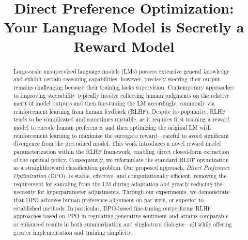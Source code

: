 \title{Direct Preference Optimization: Your Language Model is Secretly a Reward Model}

\begin{abstract}
Large-scale unsupervised language models (LMs) possess extensive general knowledge and exhibit certain reasoning capabilities; however, precisely steering their output remains challenging because their training lacks supervision. Contemporary approaches to improving steerability typically involve collecting human judgments on the relative merit of model outputs and then fine-tuning the LM accordingly, commonly via reinforcement learning from human feedback (RLHF). Despite its popularity, RLHF tends to be complicated and sometimes unstable, as it requires first training a reward model to encode human preferences and then optimizing the original LM with reinforcement learning to maximize the surrogate reward—careful to avoid significant divergence from the pretrained model. This work introduces a novel reward model parameterization within the RLHF framework, enabling direct closed-form extraction of the optimal policy. Consequently, we reformulate the standard RLHF optimization as a straightforward classification problem. Our proposed approach, \textit{Direct Preference Optimization} (DPO), is stable, effective, and computationally efficient, removing the requirement for sampling from the LM during adaptation and greatly reducing the necessity for hyperparameter adjustments. Through our experiments, we demonstrate that DPO achieves human preference alignment on par with, or superior to, established methods. In particular, DPO-based fine-tuning outperforms RLHF approaches based on PPO in regulating generative sentiment and attains comparable or enhanced results in both summarization and single-turn dialogue—all while offering greater implementation and training simplicity.
\end{abstract}

